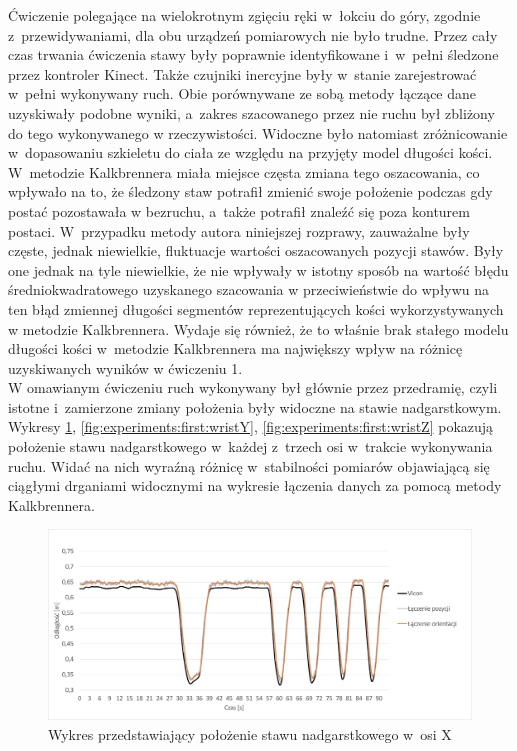 Ćwiczenie polegające na wielokrotnym zgięciu ręki w~łokciu do góry, zgodnie z~przewidywaniami, dla obu urządzeń pomiarowych nie było trudne. Przez cały czas trwania ćwiczenia stawy były poprawnie identyfikowane i~w~pełni śledzone przez kontroler Kinect. Także czujniki inercyjne były w~stanie zarejestrować w~pełni  wykonywany ruch. Obie porównywane ze sobą metody łączące dane uzyskiwały podobne wyniki, a~zakres szacowanego przez nie ruchu był zbliżony do tego wykonywanego w rzeczywistości. Widoczne było natomiast zróżnicowanie w~dopasowaniu szkieletu do ciała ze względu na przyjęty model długości kości. W~metodzie Kalkbrennera miała miejsce częsta zmiana tego oszacowania, co wpływało na to, że śledzony staw potrafił zmienić swoje położenie podczas gdy postać pozostawała w bezruchu, a~także potrafił znaleźć się poza konturem postaci. W~przypadku metody autora niniejszej rozprawy, zauważalne były częste, jednak niewielkie, fluktuacje wartości oszacowanych pozycji stawów. Były one jednak na tyle niewielkie, że nie wpływały w istotny sposób na wartość błędu średniokwadratowego uzyskanego szacowania w przeciwieństwie do wpływu na ten błąd zmiennej długości segmentów reprezentujących kości wykorzystywanych w metodzie Kalkbrennera. Wydaje się również, że to właśnie brak stałego modelu długości kości w~metodzie Kalkbrennera ma największy wpływ na różnicę uzyskiwanych wyników w ćwiczeniu 1. \\
						
W omawianym ćwiczeniu ruch wykonywany był głównie przez przedramię, czyli istotne i~zamierzone zmiany położenia były widoczne na stawie nadgarstkowym. Wykresy \ref{fig:experiments:first:wristX}, \ref{fig:experiments:first:wristY}, \ref{fig:experiments:first:wristZ} pokazują położenie stawu nadgarstkowego w~każdej z~trzech osi w~trakcie wykonywania ruchu. Widać na nich wyraźną różnicę w~stabilności pomiarów objawiającą się ciągłymi drganiami widocznymi na wykresie łączenia danych za pomocą metody Kalkbrennera.
						
\begin{savenotes}
	\begin{figure}[!htb]
		\centering
		\includegraphics[width=0.9\linewidth]{images/100/Slide4.png}
		\caption{Wykres przedstawiający położenie stawu nadgarstkowego w~osi X}
		\label{fig:experiments:first:wristX}
	\end{figure}
\end{savenotes}
								
